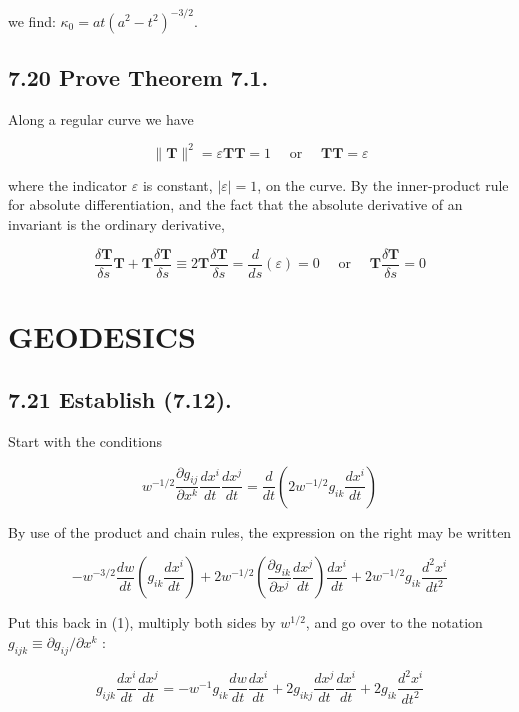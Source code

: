 \documentclass[10pt]{article}
\begin{document}
we find: $\kappa_{0}=a t\left(a^{2}-t^{2}\right)^{-3 / 2}$.

\subsection*{7.20 Prove Theorem 7.1.}
Along a regular curve we have

$$
\|\mathbf{T}\|^{2}=\varepsilon \mathbf{T} \mathbf{T}=1 \quad \text { or } \quad \mathbf{T T}=\varepsilon
$$

where the indicator $\varepsilon$ is constant, $|\varepsilon|=1$, on the curve. By the inner-product rule for absolute differentiation, and the fact that the absolute derivative of an invariant is the ordinary derivative,

$$
\frac{\delta \mathbf{T}}{\delta s} \mathbf{T}+\mathbf{T} \frac{\delta \mathbf{T}}{\delta s} \equiv 2 \mathbf{T} \frac{\delta \mathbf{T}}{\delta s}=\frac{d}{d s}(\varepsilon)=0 \quad \text { or } \quad \mathbf{T} \frac{\delta \mathbf{T}}{\delta s}=0
$$

\section*{GEODESICS}
\subsection*{7.21 Establish (7.12).}
Start with the conditions


\begin{equation*}
w^{-1 / 2} \frac{\partial g_{i j}}{\partial x^{k}} \frac{d x^{i}}{d t} \frac{d x^{j}}{d t}=\frac{d}{d t}\left(2 w^{-1 / 2} g_{i k} \frac{d x^{i}}{d t}\right) \tag{1}
\end{equation*}


By use of the product and chain rules, the expression on the right may be written

$$
-w^{-3 / 2} \frac{d w}{d t}\left(g_{i k} \frac{d x^{i}}{d t}\right)+2 w^{-1 / 2}\left(\frac{\partial g_{i k}}{\partial x^{j}} \frac{d x^{j}}{d t}\right) \frac{d x^{i}}{d t}+2 w^{-1 / 2} g_{i k} \frac{d^{2} x^{i}}{d t^{2}}
$$

Put this back in (1), multiply both sides by $w^{1 / 2}$, and go over to the notation $g_{i j k} \equiv \partial g_{i j} / \partial x^{k}$ :

$$
g_{i j k} \frac{d x^{i}}{d t} \frac{d x^{j}}{d t}=-w^{-1} g_{i k} \frac{d w}{d t} \frac{d x^{i}}{d t}+2 g_{i k j} \frac{d x^{j}}{d t} \frac{d x^{i}}{d t}+2 g_{i k} \frac{d^{2} x^{i}}{d t^{2}}
$$
\end{document}
